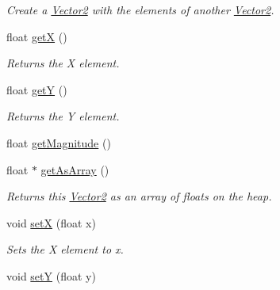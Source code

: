 \begin{DoxyCompactItemize}
\begin{DoxyCompactList}\small\item\em Create a \hyperlink{classBrickware_1_1Math_1_1Vector2}{Vector2} with the elements of another \hyperlink{classBrickware_1_1Math_1_1Vector2}{Vector2}. \end{DoxyCompactList}\item 
float \hyperlink{classBrickware_1_1Math_1_1Vector2_a6942575bca437a8e27c2a77ca7592494}{get\+X} ()
\begin{DoxyCompactList}\small\item\em Returns the X element. \end{DoxyCompactList}\item 
float \hyperlink{classBrickware_1_1Math_1_1Vector2_a2ad5b3546ccc67ecb92fcbf974c89b47}{get\+Y} ()
\begin{DoxyCompactList}\small\item\em Returns the Y element. \end{DoxyCompactList}\item 
float \hyperlink{classBrickware_1_1Math_1_1Vector2_ac719a517bbf5c44978c8d4362141eef2}{get\+Magnitude} ()
\item 
\hypertarget{classBrickware_1_1Math_1_1Vector2_a0df9a2b4ef0cb48b0918db78bdadc014}{}float $\ast$ \hyperlink{classBrickware_1_1Math_1_1Vector2_a0df9a2b4ef0cb48b0918db78bdadc014}{get\+As\+Array} ()\label{classBrickware_1_1Math_1_1Vector2_a0df9a2b4ef0cb48b0918db78bdadc014}

\begin{DoxyCompactList}\small\item\em Returns this \hyperlink{classBrickware_1_1Math_1_1Vector2}{Vector2} as an array of floats on the heap. \end{DoxyCompactList}\item 
\hypertarget{classBrickware_1_1Math_1_1Vector2_a1b48b1815ef6c1ee30db95115c7aedd8}{}void \hyperlink{classBrickware_1_1Math_1_1Vector2_a1b48b1815ef6c1ee30db95115c7aedd8}{set\+X} (float x)\label{classBrickware_1_1Math_1_1Vector2_a1b48b1815ef6c1ee30db95115c7aedd8}

\begin{DoxyCompactList}\small\item\em Sets the X element to x. \end{DoxyCompactList}\item 
\hypertarget{classBrickware_1_1Math_1_1Vector2_a9a2d336722ae0f62324c18c784f7738e}{}void \hyperlink{classBrickware_1_1Math_1_1Vector2_a9a2d336722ae0f62324c18c784f7738e}{set\+Y} (float y)\label{classBrickware_1_1Math_1_1Vector2_a9a2d336722ae0f62324c18c784f7738e}


\end{DoxyCompactItemize}
